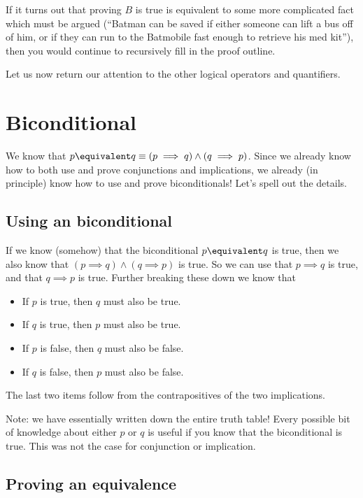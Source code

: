 If it turns out that proving $B$ is true is equivalent to some more complicated fact which must be argued (``Batman can be saved if either someone can lift a bus off of him, or if they can run to the Batmobile fast enough to retrieve his med kit''), then you would continue to recursively fill in the proof outline.

Let us now return our attention to the other logical operators and quantifiers.

\newpage

\section{Biconditional}

We know that $p \equivalent q \equiv (p \implies q) \wedge (q \implies p)$.  Since we already know how to both use and prove conjunctions and implications, we already (in principle) know how to use and prove biconditionals!  Let's spell out the details.

\subsection{Using an biconditional} 

If we know (somehow) that the biconditional $p \equivalent q$ is true, then we also know that $(p \implies q) \wedge (q \implies p)$ is true.  So we can use that $p \implies q$ is true, and that $q \implies p$ is true.   Further breaking these down we know that

\begin{itemize}
		\item If $p$ is true, then $q$ must also be true.
		\item If $q$ is true, then $p$ must also be true.
		\item If $p$ is false, then $q$ must also be false.
		\item If $q$ is false, then $p$ must also be false. 
	\end{itemize}

The last two items follow from the contrapositives of the two implications.

Note:  we have essentially written down the entire truth table!  Every possible bit of knowledge about either $p$ or $q$ is useful if you know that the biconditional is true.  This was not the case for conjunction or implication.

\subsection{Proving an equivalence}

